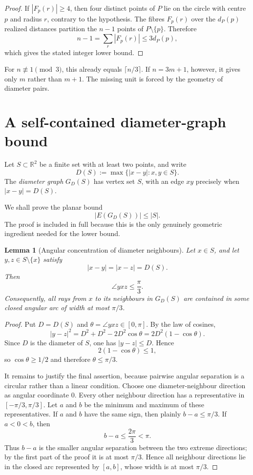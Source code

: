 \documentclass[11pt]{article}
\newtheorem{lemma}[lemma]{Lemma}
\theoremstyle{definition}
\theoremstyle{remark}
\newcommand{\R}{\mathbb{R}}
\begin{document}
\begin{proof}
If $|F_p(r)|\ge4$, then four distinct points of $P$ lie on the circle with centre $p$ and radius $r$, contrary to the hypothesis.  The fibres $F_p(r)$ over the $d_P(p)$ realized distances partition the $n-1$ points of $P\setminus\{p\}$.  Therefore
\[
 n-1=\sum_r |F_p(r)|\le3d_P(p),
\]
which gives the stated integer lower bound.
\end{proof}

For $n\not\equiv1\pmod3$, this already equals $\lceil n/3\rceil$.  If $n=3m+1$, however, it gives only $m$ rather than $m+1$.  The missing unit is forced by the geometry of diameter pairs.

\section{A self-contained diameter-graph bound}\label{sec:diameter}

Let $S\subset\R^2$ be a finite set with at least two points, and write
\[
 D(S):=\max\{|x-y|:x,y\in S\}.
\]
The \emph{diameter graph} $G_D(S)$ has vertex set $S$, with an edge $xy$ precisely when $|x-y|=D(S)$.

We shall prove the planar bound
\[
 |E(G_D(S))|\le |S|.
\]
The proof is included in full because this is the only genuinely geometric ingredient needed for the lower bound.

\begin{lemma}[Angular concentration of diameter neighbours]\label{lem:angular}
Let $x\in S$, and let $y,z\in S\setminus\{x\}$ satisfy
\[
 |x-y|=|x-z|=D(S).
\]
Then
\[
 \angle yxz\le\frac{\pi}{3}.
\]
Consequently, all rays from $x$ to its neighbours in $G_D(S)$ are contained in some closed angular arc of width at most $\pi/3$.
\end{lemma}

\begin{proof}
Put $D=D(S)$ and $\theta=\angle yxz\in[0,\pi]$.  By the law of cosines,
\[
 |y-z|^2=D^2+D^2-2D^2\cos\theta
          =2D^2(1-\cos\theta).
\]
Since $D$ is the diameter of $S$, one has $|y-z|\le D$.  Hence
\[
 2(1-\cos\theta)\le1,
\]
so $\cos\theta\ge1/2$ and therefore $\theta\le\pi/3$.

It remains to justify the final assertion, because pairwise angular separation is a circular rather than a linear condition.  Choose one diameter-neighbour direction as angular coordinate $0$.  Every other neighbour direction has a representative in $[-\pi/3,\pi/3]$.  Let $a$ and $b$ be the minimum and maximum of these representatives.  If $a$ and $b$ have the same sign, then plainly $b-a\le\pi/3$.  If $a<0<b$, then
\[
 b-a\le\frac{2\pi}{3}<\pi.
\]
Thus $b-a$ is the smaller angular separation between the two extreme directions; by the first part of the proof it is at most $\pi/3$.  Hence all neighbour directions lie in the closed arc represented by $[a,b]$, whose width is at most $\pi/3$.
\end{proof}
\end{document}
